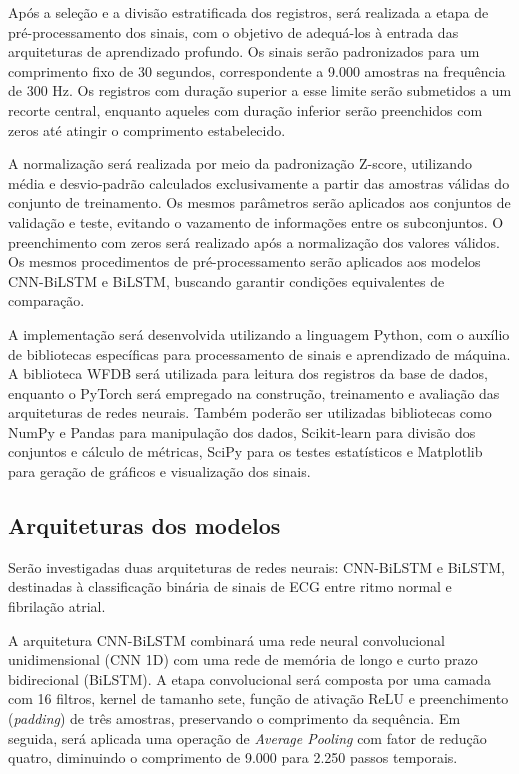\documentclass[
    12pt,                %
    openright,           %
    oneside,             %
    a4paper,             %
    english,             %
    brazil               %
]{abntex2}
\begin{document}
Após a seleção e a divisão estratificada dos registros, será realizada
a etapa de pré-processamento dos sinais, com o objetivo de adequá-los
à entrada das arquiteturas de aprendizado profundo. Os sinais serão
padronizados para um comprimento fixo de 30 segundos, correspondente
a 9.000 amostras na frequência de 300 Hz. Os registros com duração
superior a esse limite serão submetidos a um recorte central,
enquanto aqueles com duração inferior serão preenchidos com zeros
até atingir o comprimento estabelecido.

A normalização será realizada por meio da padronização Z-score,
utilizando média e desvio-padrão calculados exclusivamente a partir
das amostras válidas do conjunto de treinamento. Os mesmos parâmetros
serão aplicados aos conjuntos de validação e teste, evitando o
vazamento de informações entre os subconjuntos. O preenchimento
com zeros será realizado após a normalização dos valores válidos.
Os mesmos procedimentos de pré-processamento serão aplicados aos
modelos CNN-BiLSTM e BiLSTM, buscando garantir condições
equivalentes de comparação.

A implementação será desenvolvida utilizando a linguagem Python,
com o auxílio de bibliotecas específicas para processamento de
sinais e aprendizado de máquina. A biblioteca WFDB será utilizada
para leitura dos registros da base de dados, enquanto o PyTorch
será empregado na construção, treinamento e avaliação das
arquiteturas de redes neurais. Também poderão ser utilizadas
bibliotecas como NumPy e Pandas para manipulação dos dados,
Scikit-learn para divisão dos conjuntos e cálculo de métricas,
SciPy para os testes estatísticos e Matplotlib para geração de gráficos e visualização dos sinais.


\subsection{Arquiteturas dos modelos}

Serão investigadas duas arquiteturas de redes neurais:
CNN-BiLSTM e BiLSTM, destinadas à classificação binária
de sinais de ECG entre ritmo normal e fibrilação atrial.

A arquitetura CNN-BiLSTM combinará uma rede neural
convolucional unidimensional (CNN 1D) com uma rede de
memória de longo e curto prazo bidirecional (BiLSTM).
A etapa convolucional será composta por uma camada
com 16 filtros, kernel de tamanho sete, função de
ativação ReLU e preenchimento (\textit{padding}) de
três amostras, preservando o comprimento da sequência.
Em seguida, será aplicada uma operação de
\textit{Average Pooling} com fator de redução quatro,
diminuindo o comprimento de 9.000 para 2.250 passos
temporais.
\end{document}
